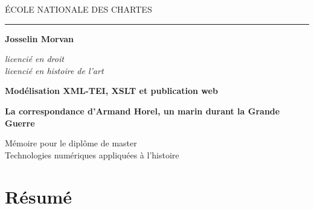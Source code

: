 \documentclass[12pt,a4paper]{book} %
\author{Josselin Morvan}
\title{}
\date{Version du \today}
\begin{document}

\frontmatter

\begin{titlepage}
\begin{center}

\bigskip

\begin{large}
\'ECOLE NATIONALE DES CHARTES
\end{large}
\begin{center}\rule{2cm}{0.02cm}\end{center}

\bigskip
\bigskip
\bigskip
\begin{Large}
\textbf{Josselin Morvan}\\
\end{Large}
\begin{normalsize} \textit{licencié en droit}\\
\textit{licencié en histoire de l'art}\\
\end{normalsize}

\bigskip
\bigskip
\bigskip

\begin{Huge}
\textbf{Modélisation XML-TEI, XSLT et publication web}\\

\end{Huge}
\bigskip
\bigskip
\begin{LARGE}
\textbf{La correspondance d'Armand Horel, un marin durant la Grande Guerre}\\
\end{LARGE}

\bigskip
\bigskip
\bigskip
\begin{large}
\end{large}
\vfill

\begin{large}
Mémoire pour le diplôme de master \\
\og Technologies numériques appliquées à l'histoire \fg{} \\
\end{large}

\end{center}
\end{titlepage}

\thispagestyle{empty}

\cleardoublepage


\section*{Résumé}
\bigskip
\end{document}
